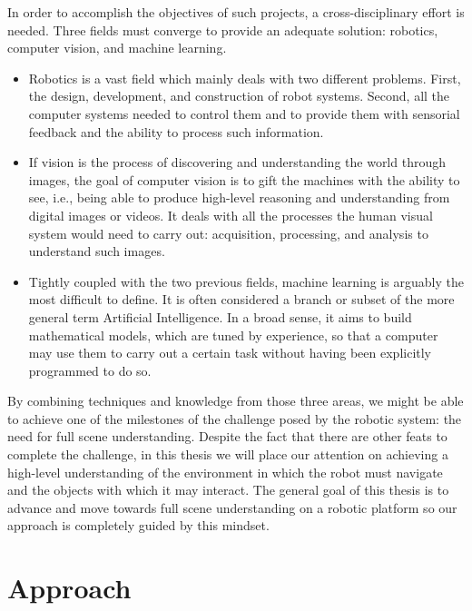 In order to accomplish the objectives of such projects, a cross-disciplinary effort is needed. Three fields must converge to provide an adequate solution: robotics, computer vision, and machine learning.

\begin{itemize}
	\item Robotics is a vast field which mainly deals with two different problems. First, the design, development, and construction of robot systems. Second, all the computer systems needed to control them and to provide them with sensorial feedback and the ability to process such information.

	\item If vision is the process of discovering and understanding the world through images, the goal of computer vision is to gift the machines with the ability to see, i.e., being able to produce high-level reasoning and understanding from digital images or videos. It deals with all the processes the human visual system would need to carry out: acquisition, processing, and analysis to understand such images.

	\item Tightly coupled with the two previous fields, machine learning is arguably the most difficult to define. It is often considered a branch or subset of the more general term Artificial Intelligence. In a broad sense, it aims to build mathematical models, which are tuned by experience, so that a computer may use them to carry out a certain task without having been explicitly programmed to do so.
\end{itemize}

By combining techniques and knowledge from those three areas, we might be able to achieve one of the milestones of the challenge posed by the robotic system: the need for full scene understanding. Despite the fact that there are other feats to complete the challenge, in this thesis we will place our attention on achieving a high-level understanding of the environment in which the robot must navigate and the objects with which it may interact. The general goal of this thesis is to advance and move towards full scene understanding on a robotic platform so our approach is completely guided by this mindset.

\section{Approach}
\label{cha:introduction:sec:approach}

